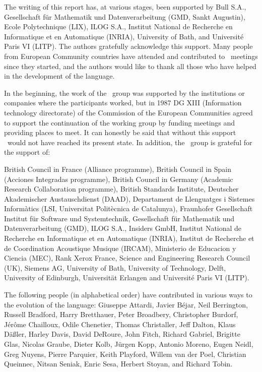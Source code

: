 \begin{foreword}
\begin{optDefinition}
The writing of this report has, at various stages, been supported by Bull S.A.,
Gesellschaft f\"ur Mathematik und Datenverarbeitung (GMD, Sankt Augustin), Ecole
Polytechnique (LIX), ILOG S.A., Institut National de Recherche en Informatique
et en Automatique (INRIA), University of Bath, and Universit\'e Paris VI (LITP).
The authors gratefully acknowledge this support.  Many people from European
Community countries have attended and contributed to \eulisp\ meetings since
they started, and the authors would like to thank all those who have helped in
the development of the language.

In the beginning, the work of the \eulisp\ group was supported by the
institutions or companies where the participants worked, but in 1987 DG XIII
(Information technology directorate) of the Commission of the European
Communities agreed to support the continuation of the working group by funding
meetings and providing places to meet.  It can honestly be said that without
this support \eulisp\ would not have reached its present state.  In addition,
the \eulisp\ group is grateful for the support of:

British Council in France (Alliance programme),
British Council in Spain (Acciones Integradas programme),
British Council in Germany (Academic Research Collaboration programme),
British Standards Institute,
Deutscher Akademischer Austauschdienst (DAAD),
Departament de Llenguatges i Sistemes Inform\`atics (LSI, Universitat
Polit\`ecnica de Catalunya),
Fraunhofer Gesellschaft Institut f\"ur Software und Systemtechnik,
Gesellschaft f\"ur Mathematik und Datenverarbeitung (GMD),
ILOG S.A.,
Insiders GmbH,
Institut National de Recherche en Informatique et en Automatique (INRIA),
Institut de Recherche et de Coordination Acoustique Musique (IRCAM),
Ministerio de Educacion y Ciencia (MEC),
Rank Xerox France,
Science and Engineering Research Council (UK),
Siemens AG,
University of Bath,
University of Technology, Delft,
University of Edinburgh,
Universit\"at Erlangen
and
Universit\'e Paris VI (LITP).

The following people (in alphabetical order) have contributed in
various ways to the evolution of the language:
Giuseppe Attardi,
Javier B\'ejar,
Neil Berrington,
Russell Bradford,
Harry Bretthauer,
Peter Broadbery,
Christopher Burdorf,
J\'er\^ome Chailloux,
Odile Chenetier,
Thomas Christaller,
Jeff Dalton,
Klaus D\"a{\ss}ler,
Harley Davis,
David DeRoure,
John Fitch,
Richard Gabriel,
Brigitte Glas,
Nicolas Graube,
Dieter Kolb,
J\"urgen Kopp,
Antonio Moreno,
Eugen Neidl,
Greg Nuyens,
Pierre Parquier,
Keith Playford,
Willem van der Poel,
Christian Queinnec,
Nitsan Seniak,
Enric Sesa,
Herbert Stoyan,
and
Richard Tobin.


\end{optDefinition}
\end{foreword}
